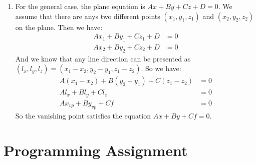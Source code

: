 \documentclass[bwprint]{gmcmthesis}
\numberwithin{figure}{section}
\begin{document}
\begin{enumerate}[label=\alph*.]
    \item For the general case, the plane equation is $Ax + By + Cz + D = 0$. We assume that there are anys two different points $(x_1, y_1, z_1)$ and $(x_2, y_2, z_2)$ on the plane. Then we have:
    \begin{equation}
        \begin{aligned}
            Ax_1 + By_1 + Cz_1 + D &= 0 \\
            Ax_2 + By_2 + Cz_2 + D &= 0
        \end{aligned}
    \end{equation}
    And we know that any line direction can be presented as $(l_x, l_y, l_z) = (x_1 - x_2, y_2 - y_1, z_1 - z_2)$. So we have:
    \begin{equation}
        \begin{aligned}
            A(x_1 - x_2) + B(y_2 - y_1) + C(z_1 - z_2) &= 0 \\
            Al_x + Bl_y + Cl_z &= 0 \\
            Ax_{vp} + By_{vp} + Cf &= 0
        \end{aligned}
    \end{equation}
    So the vanishing point satisfies the equation $Ax + By + Cf = 0$.
\end{enumerate}

\section{Programming Assignment}
\end{document}
